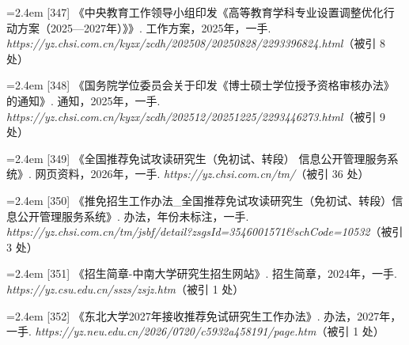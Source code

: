 {\vspace{0.6pt}
\noindent\hangindent=2.4em \label{src:S0461}{\color{cAccent}[347]} 《中央教育工作领导小组印发《高等教育学科专业设置调整优化行动方案（2025—2027年）》》. 工作方案，2025年，一手. \textit{https://yz.chsi.com.cn/kyzx/zcdh/202508/20250828/2293396824.html}（被引 8 处）\par
\vspace{0.6pt}
\noindent\hangindent=2.4em \label{src:S0462}{\color{cAccent}[348]} 《国务院学位委员会关于印发《博士硕士学位授予资格审核办法》的通知》. 通知，2025年，一手. \textit{https://yz.chsi.com.cn/kyzx/zcdh/202512/20251225/2293446273.html}（被引 9 处）\par
\vspace{0.6pt}
\noindent\hangindent=2.4em \label{src:S0464}{\color{cAccent}[349]} 《全国推荐免试攻读研究生（免初试、转段）
信息公开管理服务系统》. 网页资料，2026年，一手. \textit{https://yz.chsi.com.cn/tm/}（被引 36 处）\par
\vspace{0.6pt}
\noindent\hangindent=2.4em \label{src:S0465}{\color{cAccent}[350]} 《推免招生工作办法\_全国推荐免试攻读研究生（免初试、转段）信息公开管理服务系统》. 办法，年份未标注，一手. \textit{https://yz.chsi.com.cn/tm/jsbf/detail?zsgsId=3546001571\&schCode=10532}（被引 3 处）\par
\vspace{0.6pt}
\vspace{3.5pt}\par
\nopagebreak\vspace{1pt}
\noindent\hangindent=2.4em \label{src:S0468}{\color{cAccent}[351]} 《招生简章-中南大学研究生招生网站》. 招生简章，2024年，一手. \textit{https://yz.csu.edu.cn/sszs/zsjz.htm}（被引 1 处）\par
\vspace{0.6pt}
\vspace{3.5pt}\par
\nopagebreak\vspace{1pt}
\noindent\hangindent=2.4em \label{src:S0470}{\color{cAccent}[352]} 《东北大学2027年接收推荐免试研究生工作办法》. 办法，2027年，一手. \textit{https://yz.neu.edu.cn/2026/0720/c5932a458191/page.htm}（被引 1 处）\par
\vspace{0.6pt}
\vspace{3.5pt}\par
}
